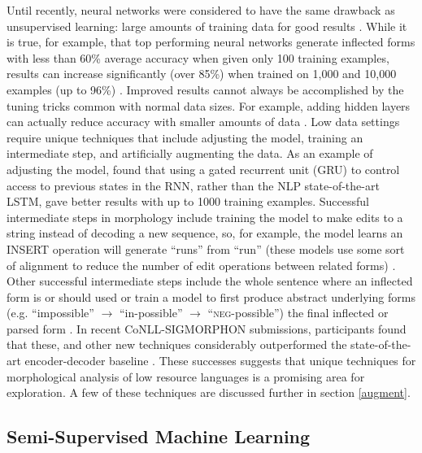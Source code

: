 \documentclass[12pt]{article}
\begin{document}
Until recently, neural networks were considered to have the same drawback as unsupervised learning: large amounts of training data for good results \cite{cotterell_conllsigmorphon_2018}. While it is true, for example, that top performing neural networks generate inflected forms with less than 60\% average accuracy when given only 100 training examples, results can increase significantly (over 85\%) when trained on 1,000 and 10,000 examples (up to 96\%) \cite{cotterell_sigmorphon_2016,cotterell_conll-sigmorphon_2017,cotterell_conllsigmorphon_2018}. Improved results cannot always be accomplished by the tuning tricks common with normal data sizes. For example, adding hidden layers can actually reduce accuracy with smaller amounts of data \cite{cotterell_conll-sigmorphon_2017}. Low data settings require unique techniques that include adjusting the model, training an intermediate step, and artificially augmenting the data. As an example of adjusting the model,  found that using a gated recurrent unit (GRU) to control access to previous states in the RNN, rather than the NLP state-of-the-art LSTM, gave better results with up to 1000 training examples. Successful intermediate steps in morphology include training the model to make edits to a string instead of decoding a new sequence, so, for example, the model learns an INSERT operation will generate ``runs'' from ``run''  (these models use some sort of alignment to reduce the number of edit operations between related forms) \cite{makarov_align_2017,makarov_uzh_2018}. Other successful intermediate steps include the whole sentence where an inflected form is or should used or train a model to first produce abstract underlying forms (e.g. ``impossible'' $\rightarrow$ ``in-possible'' $\rightarrow$ ``\textsc{neg}-possible'') the final inflected or parsed form \cite{liu_morphological_2018,moeller_improving_2019}. In recent CoNLL-SIGMORPHON submissions, participants found that these, and other new techniques considerably outperformed the state-of-the-art encoder-decoder baseline \cite{bergmanis_training_2017}. These successes suggests that unique techniques for morphological analysis of low resource languages is a promising area for exploration. A few of these techniques are discussed further in section \ref{augment}. 

\subsection{Semi-Supervised Machine Learning}
\label{semi-supervised}
\end{document}
